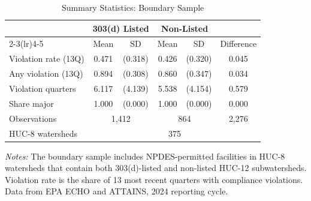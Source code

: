 \begin{table}[htbp]
\centering
\caption{Summary Statistics: Boundary Sample}
\label{tab:summary}
\begin{tabular}{lccccc}
\hline\hline
 & \multicolumn{2}{c}{303(d) Listed} & \multicolumn{2}{c}{Non-Listed} & \\
\cmidrule(lr){2-3}\cmidrule(lr){4-5}
 & Mean & SD & Mean & SD & Difference \\
\hline
Violation rate (13Q) & 0.471 & (0.318) & 0.426 & (0.320) & 0.045 \\
Any violation (13Q) & 0.894 & (0.308) & 0.860 & (0.347) & 0.034 \\
Violation quarters & 6.117 & (4.139) & 5.538 & (4.154) & 0.579 \\
Share major & 1.000 & (0.000) & 1.000 & (0.000) & 0.000 \\
\hline
Observations & \multicolumn{2}{c}{1,412} & \multicolumn{2}{c}{864} & 2,276 \\
HUC-8 watersheds & \multicolumn{5}{c}{375} \\
\hline\hline
\end{tabular}
\begin{tablenotes}[flushleft]\footnotesize
\item \textit{Notes:} The boundary sample includes NPDES-permitted facilities in HUC-8 watersheds
that contain both 303(d)-listed and non-listed HUC-12 subwatersheds.
Violation rate is the share of 13 most recent quarters with compliance violations.
Data from EPA ECHO and ATTAINS, 2024 reporting cycle.
\end{tablenotes}
\end{table}
